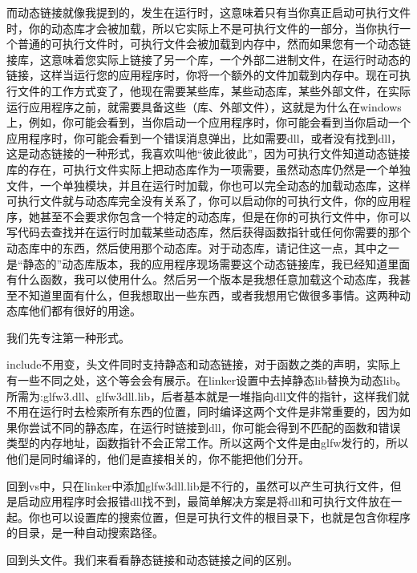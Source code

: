 而动态链接就像我提到的，发生在运行时，这意味着只有当你真正启动可执行文件时，你的动态库才会被加载，所以它实际上不是可执行文件的一部分，当你执行一个普通的可执行文件时，可执行文件会被加载到内存中，然而如果您有一个动态链接库，这意味着您实际上链接了另一个库，一个外部二进制文件，在运行时动态的链接，这样当运行您的应用程序时，你将一个额外的文件加载到内存中。现在可执行文件的工作方式变了，他现在需要某些库，某些动态库，某些外部文件，在实际运行应用程序之前，就需要具备这些（库、外部文件），这就是为什么在windows上，例如，你可能会看到，当你启动一个应用程序时，你可能会看到当你启动一个应用程序时，你可能会看到一个错误消息弹出，比如需要{\ncodestyle dll}，或者没有找到{\ncodestyle dll}，这是动态链接的一种形式，我喜欢叫他“彼此彼此”，因为可执行文件知道动态链接库的存在，可执行文件实际上把动态库作为一项需要，虽然动态库仍然是一个单独文件，一个单独模块，并且在运行时加载，你也可以完全动态的加载动态库，这样可执行文件就与动态库完全没有关系了，你可以启动你的可执行文件，你的应用程序，她甚至不会要求你包含一个特定的动态库，但是在你的可执行文件中，你可以写代码去查找并在运行时加载某些动态库，然后获得函数指针或任何你需要的那个动态库中的东西，然后使用那个动态库。对于动态库，请记住这一点，其中之一是“静态的”动态库版本，我的应用程序现场需要这个动态链接库，我已经知道里面有什么函数，我可以使用什么。然后另一个版本是我想任意加载这个动态库，我甚至不知道里面有什么，但我想取出一些东西，或者我想用它做很多事情。这两种动态库他们都有很好的用途。

我们先专注第一种形式。

{\ncodestyle include}不用变，头文件同时支持静态和动态链接，对于函数之类的声明，实际上有一些不同之处，这个等会会有展示。在{\ncodestyle linker}设置中去掉静态{\ncodestyle lib}替换为动态{\ncodestyle lib}。所需为:{\ncodestyle glfw3.dll}、{\ncodestyle glfw3dll.lib}，后者基本就是一堆指向{\ncodestyle dll}文件的指针，这样我们就不用在运行时去检索所有东西的位置，同时编译这两个文件是非常重要的，因为如果你尝试不同的静态库，在运行时链接到{\ncodestyle dll}，你可能会得到不匹配的函数和错误类型的内存地址，函数指针不会正常工作。所以这两个文件是由{\ncodestyle glfw}发行的，所以他们是同时编译的，他们是直接相关的，你不能把他们分开。

回到vs中，只在{\ncodestyle linker}中添加{\ncodestyle glfw3dll.lib}是不行的，虽然可以产生可执行文件，但是启动应用程序时会报错{\ncodestyle dll}找不到，最简单解决方案是将{\ncodestyle dll}和可执行文件放在一起。你也可以设置库的搜索位置，但是可执行文件的根目录下，也就是包含你程序的目录，是一种自动搜索路径。


回到头文件。我们来看看静态链接和动态链接之间的区别。

